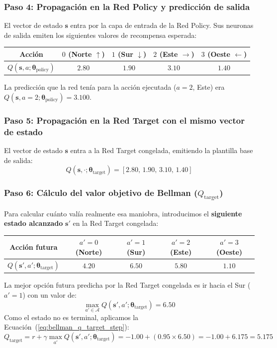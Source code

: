 \begin{calculomanual}
\subsubsection*{Paso 4: Propagación en la Red Policy y predicción de salida}
El vector de estado $\mathbf{s}$ entra por la capa de entrada de la Red Policy. Sus neuronas de salida emiten los siguientes valores de recompensa esperada:
\begin{center}
\small\setlength{\tabcolsep}{6pt}
\begin{tabular}{ccccc}
  \toprule
  Acción & $0$ (Norte $\uparrow$) & $1$ (Sur $\downarrow$) & $2$ (Este $\rightarrow$) & $3$ (Oeste $\leftarrow$) \\
  \midrule
  $Q(\mathbf{s}, a; \boldsymbol{\theta}_{\text{policy}})$ & $2.80$ & $1.90$ & $\mathbf{3.10}$ & $1.40$ \\
  \bottomrule
\end{tabular}
\end{center}
La predicción que la red tenía para la acción ejecutada ($a=2$, Este) era $Q(\mathbf{s}, a=2; \boldsymbol{\theta}_{\text{policy}}) = \mathbf{3.100}$.

\subsubsection*{Paso 5: Propagación en la Red Target con el mismo vector de estado}
El vector de estado $\mathbf{s}$ entra a la Red Target congelada, emitiendo la plantilla base de salida:
\[
  Q(\mathbf{s}, \cdot; \boldsymbol{\theta}_{\text{target}}) = [2.80, \, 1.90, \, 3.10, \, 1.40]
\]

\subsubsection*{Paso 6: Cálculo del valor objetivo de Bellman ($Q_{\text{target}}$)}
Para calcular cuánto valía realmente esa maniobra, introducimos el \textbf{siguiente estado alcanzado} $\mathbf{s}'$ en la Red Target congelada:
\begin{center}
\small\setlength{\tabcolsep}{6pt}
\begin{tabular}{ccccc}
  \toprule
  Acción futura & $a'=0$ (Norte) & $a'=1$ (Sur) & $a'=2$ (Este) & $a'=3$ (Oeste) \\
  \midrule
  $Q(\mathbf{s}', a'; \boldsymbol{\theta}_{\text{target}})$ & $4.20$ & $\mathbf{6.50}$ & $5.80$ & $1.10$ \\
  \bottomrule
\end{tabular}
\end{center}
La mejor opción futura predicha por la Red Target congelada es ir hacia el Sur ($a'=1$) con un valor de:
\[
  \max_{a' \in \mathcal{A}} Q(\mathbf{s}', a'; \boldsymbol{\theta}_{\text{target}}) = \mathbf{6.50}
\]
Como el estado no es terminal, aplicamos la Ecuación~(\ref{eq:bellman_q_target_step}):
\[
  Q_{\text{target}} = r + \gamma \max_{a'} Q(\mathbf{s}', a'; \boldsymbol{\theta}_{\text{target}}) = -1.00 + (0.95 \times 6.50) = -1.00 + 6.175 = \mathbf{5.175}
\]


\end{calculomanual}
